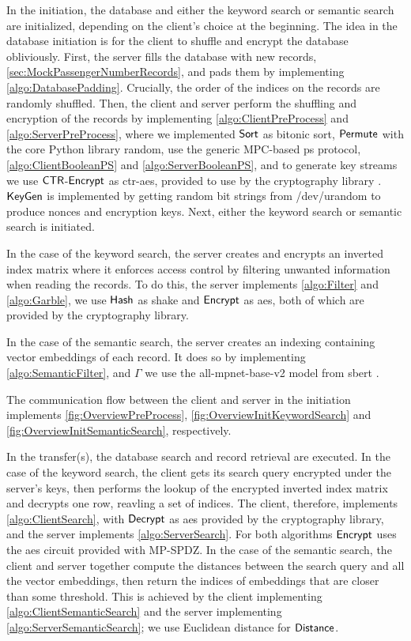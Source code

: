 In the initiation, the database and either the keyword search or semantic search are initialized, depending on the client's choice at the beginning. The idea in the database initiation is for the client to shuffle and encrypt the database obliviously. First, the server fills the database with new records, \cref{sec:MockPassengerNumberRecords}, and pads them by implementing \cref{algo:DatabasePadding}. Crucially, the order of the indices on the records are randomly shuffled. Then, the client and server perform the shuffling and encryption of the records by implementing \cref{algo:ClientPreProcess} and \cref{algo:ServerPreProcess}, where we implemented $ \mathsf{{Sort}} $ as bitonic sort, $ \mathsf{{Permute}} $ with the core Python library random, use the generic MPC-based \acrshort{ps} protocol, \cref{algo:ClientBooleanPS} and \cref{algo:ServerBooleanPS}, and to generate key streams we use $ \mathsf{{CTR}}$-$\mathsf{{Encrypt}} $ as \acrshort{ctr}-\acrshort{aes}, provided to use by the cryptography library \cite{pycaCryptography}. $ \mathsf{{KeyGen}} $ is implemented by getting random bit strings from /dev/urandom to produce nonces and encryption keys. Next, either the keyword search or semantic search is initiated.

 In the case of the keyword search, the server creates and encrypts an inverted index matrix where it enforces access control by filtering unwanted information when reading the records. To do this, the server implements \cref{algo:Filter} and \cref{algo:Garble}, we use $ \mathsf{Hash} $ as \acrshort{shake} and $ \mathsf{{Encrypt}} $ as \acrshort{aes}, both of which are provided by the cryptography library. 

In the case of the semantic search, the server creates an indexing containing vector embeddings of each record. It does so by implementing \cref{algo:SemanticFilter}, and $ \Gamma $ we use the all-mpnet-base-v2 model from \acrfull{sbert} \cite{reimers-2019-sentence-bert}. 

The communication flow between the client and server in the initiation implements \cref{fig:OverviewPreProcess}, \cref{fig:OverviewInitKeywordSearch} and \cref{fig:OverviewInitSemanticSearch}, respectively.

In the transfer(s), the database search and record retrieval are executed. In the case of the keyword search, the client gets its search query encrypted under the server's keys, then performs the lookup of the encrypted inverted index matrix and decrypts one row, reavling a set of indices. The client, therefore, implements \cref{algo:ClientSearch}, with $ \mathsf{{Decrypt}} $ as \acrshort{aes} provided by the cryptography library, and the server implements \cref{algo:ServerSearch}. For both algorithms $ \mathsf{{Encrypt}} $ uses the \acrshort{aes} circuit provided with MP-SPDZ. In the case of the semantic search, the client and server together compute the distances between the search query and all the vector embeddings, then return the indices of embeddings that are closer than some threshold. This is achieved by the client implementing \cref{algo:ClientSemanticSearch} and the server implementing \cref{algo:ServerSemanticSearch}; we use Euclidean distance for $ \mathsf{{Distance}} $.

